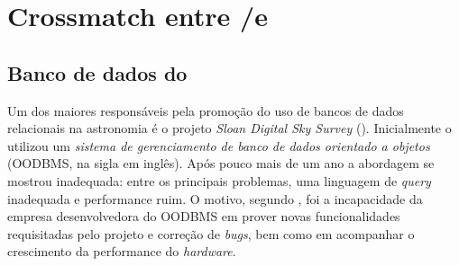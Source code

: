 


\chapter{Crossmatch entre \SDSS/\starlight e \galex}
\label{sec:Crossmatch}

\section{Banco de dados do \SDSS}
Um dos maiores responsáveis pela promoção do uso de bancos de dados relacionais
na astronomia é o projeto {\em Sloan Digital Sky Survey} (\SDSS). Inicialmente o
\SDSS utilizou um {\em sistema de gerenciamento de banco de dados orientado a
objetos} \citep{Maier1986} (OODBMS, na sigla em inglês). Após pouco mais de um
ano a abordagem se mostrou inadequada: entre os principais problemas, uma
linguagem de {\em query} inadequada e performance ruim. O motivo, segundo
\citet{Thakar2004}, foi a incapacidade da empresa desenvolvedora do OODBMS em
prover novas funcionalidades requisitadas pelo projeto e correção de {\em bugs},
bem como em acompanhar o crescimento da performance do {\em hardware}.

